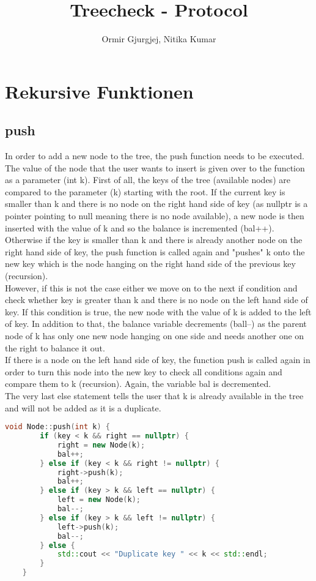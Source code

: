 \documentclass[12pt]{article}
\begin{document}
\title{{\huge \bfseries Treecheck - Protocol}}
\author{Ormir Gjurgjej, Nitika Kumar}
\maketitle

\section{Rekursive Funktionen}
\subsection{push} 
In order to add a new node to the tree, the push function needs to be executed. \\The value of the node that the user wants to insert is given over to the function as a parameter (int k). First of all, the keys of the tree (available nodes) are compared to the parameter (k) starting with the root. If the current key is smaller than k and there is no node on the right hand side of key (as nullptr is a pointer pointing to null meaning there is no node available), a new node is then inserted with the value of k and so the balance is incremented (bal++).\\Otherwise if the key is smaller than k and there is already another node on the right hand side of key, the push function is called again and "pushes" k onto the new key which is the node hanging on the right hand side of the previous key (recursion). \\However, if this is not the case either we move on to the next if condition and check whether key is greater than k and there is no node on the left hand side of key. If this condition is true, the new node with the value of k is added to the left of key. In addition to that, the balance variable decrements (ball--) as the parent node of k has only one new node hanging on one side and needs another one on the right to balance it out. \\
If there is a node on the left hand side of key, the function push is called again in order to turn this node into the new key to check all conditions again and compare them to k (recursion). Again, the variable bal is decremented.\\
The very last else statement tells the user that k is already available in the tree and will not be added as it is a duplicate.
\\
	\begin{lstlisting}[language=C++, caption=Push function]
	void Node::push(int k) {
	    if (key < k && right == nullptr) {
	        right = new Node(k);
	        bal++;
	    } else if (key < k && right != nullptr) {
	        right->push(k);
	        bal++;
	    } else if (key > k && left == nullptr) {
	        left = new Node(k);
	        bal--;
	    } else if (key > k && left != nullptr) {
	        left->push(k);
	        bal--;
	    } else {
	        std::cout << "Duplicate key " << k << std::endl;
	    }
	}
	\end{lstlisting}
\end{document}
